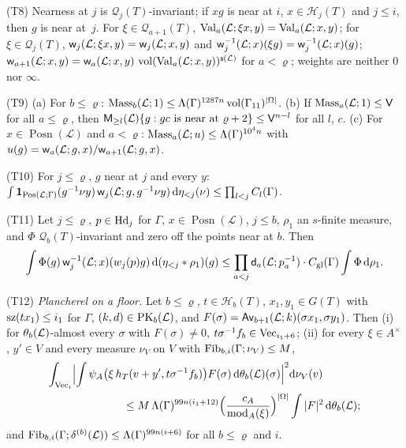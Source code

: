 \documentclass[11pt,a4paper]{article}
\newcommand{\m}[1]{\mbox{$#1$}}        %
\theoremstyle{plainx}
\theoremstyle{uprightx}
\newcommand{\cL}{\mathcal{L}}
\newcommand{\dd}{\mathrm{d}}
\newcommand{\GT}[1]{G(#1)}
\newcommand{\Hl}[2]{\mathcal{H}_{#1}(#2)}
\newcommand{\Ql}[2]{\mathcal{Q}_{#1}(#2)}
\newcommand{\modA}{\operatorname{mod}_A}
\newcommand{\wl}[2]{w_{#1}(#2)}
\newcommand{\Posn}[1]{\operatorname{Posn}(#1)}
\newcommand{\etab}[1]{\eta_{<#1}}
\newcommand{\vol}{\operatorname{vol}}
\newcommand{\quadric}[2]{\delta^{(#2)}(#1)}
\newcommand{\Inp}[1]{\textup{(#1)}}
\begin{document}
\Inp{T8} Nearness at $j$ is $\Ql{j}{T}$-invariant; if $xg$ is near at $i$, $x\in\Hl{j}{T}$ and $j\le i$, then $g$ is
near at~$j$. For $\xi\in\Ql{a+1}{T}$, $\floorValues{\cL}{a}{\xi x}{y}=\floorValues{\cL}{a}{x}{y}$; for
$\xi\in\Ql{j}{T}$, $\floorWeight{\cL}{j}{\xi x}{y}=\floorWeight{\cL}{j}{x}{y}$ and
$\invWeight{\cL}{j}{x}(\xi g)=\invWeight{\cL}{j}{x}(g)$; $\floorWeight{\cL}{a+1}{x}{y}=\floorWeight{\cL}{a}{x}{y}\,
\vol(\floorValues{\cL}{a}{x}{y})^{\volumeExponent{\cL}}$ for $a<\varrho$; weights are neither $0$ nor $\infty$.

\Inp{T9} (a) For $b\le\varrho$: \m{\FloorMassLe{\cL}{b}{\Lambda(\Gamma)^{1287n}\vol(\Gamma_{11})^{|\Omega|}}{1}}. (b)
If \m{\FloorMassLe{\cL}{a}{\mathsf{V}}{1}} for all $a\le\varrho$, then
$\upperMeasure{\cL}{l}\{g:gc\text{ is near at }\varrho+2\}\le\mathsf{V}^{n-l}$ for all $l$, $c$. (c) For $x\in\Posn{\cL}$ and
$a<\varrho$: \m{\FloorMassLe{\cL}{a}{\Lambda(\Gamma)^{10^{4}n}}{u}} with
$u(g)=\floorWeight{\cL}{a}{g}{x}/\floorWeight{\cL}{a+1}{g}{x}$.

\Inp{T10} For $j\le\varrho$, $g$ near at $j$ and every $y$:
$\int\mathbf{1}_{\positionsOfSize{\cL}{\Gamma}}(g^{-1}\nu y)\,\floorWeight{\cL}{j}{g}{g^{-1}\nu y}\,\dd\etab{j}(\nu)\le\prod_{l<j}\floorConst{\Gamma}{l}$.

\Inp{T11} Let $j\le\varrho$, \m{\IsHead{j}{p}} for $\Gamma$, $x\in\Posn{\cL}$, $j\le b$, $\rho_1$ an $s$-finite
measure, and $\Phi$ $\Ql{b}{T}$-invariant and zero off the points near at $b$. Then
\[\int\Phi(g)\,\invWeight{\cL}{j}{x}(\wl{j}{p}g)\,\dd(\etab{j}*\rho_1)(g)\le\prod_{a<j}\floorModulus{\cL}{a}{p_a^{-1}}\cdot\globalConst{\Gamma}\int\Phi\,\dd\rho_1.\]

\Inp{T12} \emph{Plancherel on a floor.} Let $b\le\varrho$, $t\in\Hl{b}{T}$, $x_1,y_1\in\GT{T}$ with
\m{\HasMatSize{i_1}{tx_1}} for $\Gamma$, \m{\IsPairingKernel{\cL}{b}{k}{d}}, and
$F(\sigma)=\upperPairing{\cL}{b+1}{k}{\sigma x_1}{\sigma y_1}$. Then (i) for $\floorMeasure{\cL}{b}$-almost every
$\sigma$ with $F(\sigma)\ne0$, $t\sigma^{-1}f_b\in\mathrm{Vec}_{i_1+6}$; (ii) for every $\xi\in A^{\times}$,
$y'\in V$ and every measure $\nu_V$ on $V$ with \m{\HasFibreBound{\Gamma}{b}{\nu_V}{i}{M}},
\[\begin{aligned}\int_{\vecsOfSize{i}}\Bigl|\int\psi_A\bigl(\xi\,h_T(v+y',t\sigma^{-1}f_b)\bigr)F(\sigma)\,\dd\floorMeasure{\cL}{b}(\sigma)\Bigr|^{2}&\dd\nu_V(v)\\
\le M\,\Lambda(\Gamma)^{99n(i_1+12)}\Bigl(\frac{c_A}{\modA(\xi)}\Bigr)^{|\Omega|}&\int|F|^{2}\,\dd\floorMeasure{\cL}{b};\end{aligned}\]
and \m{\HasFibreBound{\Gamma}{b}{\quadric{\cL}{b}}{i}{\Lambda(\Gamma)^{99n(i+6)}}} for all $b\le\varrho$ and $i$.
\end{document}
